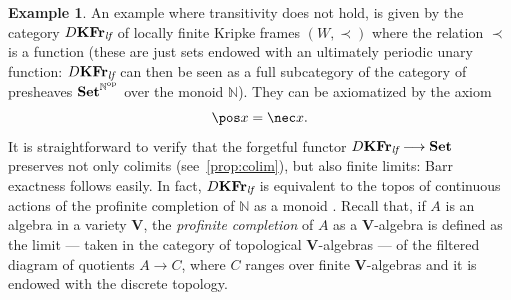 \documentclass{article}
\theoremstyle{definition}
\newtheorem{example}{Example}
\newcommand{\KFr}{\textup{\textbf{KFr}}}
\newcommand{\lf}{\textit{lf}}
\newcommand{\op}{\textup{op}}
\newcommand{\Set}{\textup{\textbf{Set}}}
\begin{document}
\begin{example}
An example where transitivity does not hold, is given by the category $D\KFr_\lf$ of locally finite Kripke frames $(W,\prec)$ where  the relation $\prec$ is a function (these are just sets endowed with an ultimately periodic unary function: $D\KFr_\lf$ can then be seen as a full subcategory of the category of presheaves $\Set^{\mathbb{N}^\op}$ over the monoid $\mathbb{N}$). They can be axiomatized  by  the axiom
$$\pos x = \nec x.$$
It is straightforward to verify that the forgetful functor $D\KFr_\lf \longrightarrow \Set$ preserves not only colimits (see~\cref{prop:colim}), but also finite limits: Barr exactness follows easily.
In fact, $D\KFr_\lf$ is equivalent to the topos of continuous actions of the profinite completion of $\mathbb{N}$ as a monoid \cite{MR4535663}. Recall that, if $A$ is an algebra in a variety $\mathbf{V}$, the \emph{profinite completion} of $A$ as a $\mathbf{V}$-algebra is defined as the limit --- taken in the category of topological $\mathbf{V}$-algebras --- of the filtered diagram of quotients $A \longrightarrow C$, where $C$ ranges over finite $\mathbf{V}$-algebras and it is endowed with the discrete topology.
\end{example}
\end{document}

